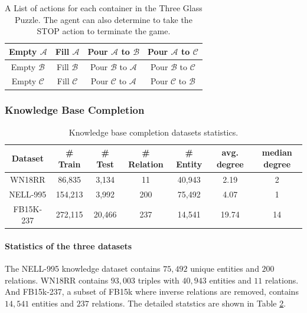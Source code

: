 \begin{table}[t]
	\centering
	{%
		\caption{A List of actions for each container in the Three Glass Puzzle. The agent can also determine to take the STOP action to terminate the game.}
		\label{tab:puzzle_actions}
		\begin{tabular}{|c|c|c|c|}
			\hline
			 Empty $\mathcal{A}$ & Fill $\mathcal{A}$ & Pour $\mathcal{A}$ to $\mathcal{B}$  & Pour $\mathcal{A}$ to $\mathcal{C}$ \\
			 \hline
			 Empty $\mathcal{B}$ & Fill $\mathcal{B}$ & Pour $\mathcal{B}$ to $\mathcal{A}$  & Pour $\mathcal{B}$ to $\mathcal{C}$ \\
			 \hline
			 Empty $\mathcal{C}$ & Fill $\mathcal{C}$ & Pour $\mathcal{C}$ to $\mathcal{A}$  & Pour $\mathcal{C}$ to $\mathcal{B}$ \\
			\hline
		\end{tabular}
	}
\end{table}



\label{Appendix:puzzle_details}


\subsubsection{Knowledge Base Completion}
\label{Appendix:kbc_details}

\begin{table}[t]
\caption{Knowledge base completion datasets statistics.}
\label{tab:kbc_stats}
\centering
\begin{tabular}{c cccccc}
\toprule
Dataset  & \# Train & \# Test & \# Relation & \# Entity & avg. degree & median degree\\
\midrule
WN18RR & 86,835 & 3,134 & 11 & 40,943 &  2.19 & 2 \\
NELL-995 & 154,213 & 3,992 & 200 & 75,492 & 4.07 & 1 \\
FB15K-237 & 272,115 & 20,466 & 237 & 14,541 & 19.74 & 14\\
\bottomrule
\end{tabular}
\end{table}

\paragraph{Statistics of the three datasets}
The NELL-995 knowledge dataset contains $75,492$ unique entities and $200$ relations. 
WN18RR contains $93,003$ triples with $40,943$ entities and $11$ relations. And FB15k-237, a subset of FB15k where inverse relations are removed, contains $14,541$ entities and $237$ relations. The detailed statstics are shown in Table \ref{tab:kbc_stats}.


